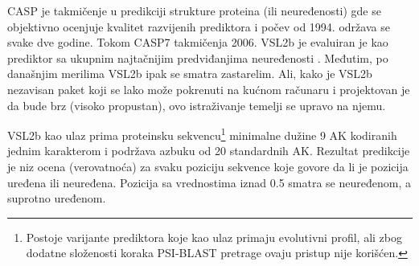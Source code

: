 CASP  je takmičenje u
predikciji strukture proteina (ili neuređenosti) gde se objektivno ocenjuje
kvalitet razvijenih prediktora i počev od 1994. održava se svake dve godine.
Tokom CASP7 takmičenja 2006. VSL2b je evaluiran je kao prediktor sa ukupnim
najtačnijim predviđanjima neuređenosti \parencite{He2009}. Međutim, po
današnjim merilima \parencite{Meng2017} VSL2b ipak se smatra zastarelim.  Ali,
kako je VSL2b nezavisan paket koji se lako može pokrenuti na kućnom računaru i
projektovan je da bude brz (visoko propustan), ovo istraživanje temelji se
upravo na njemu.

VSL2b kao ulaz prima proteinsku sekvencu\footnote{
  Postoje varijante prediktora koje kao ulaz primaju evolutivni profil, ali zbog
  dodatne složenosti koraka PSI-BLAST pretrage ovaju pristup nije korišćen.
}
minimalne dužine 9 AK kodiranih jednim
karakterom i podržava azbuku od 20 standardnih AK. Rezultat predikcije je niz
ocena (verovatnoća) za svaku poziciju sekvence
koje govore da li je pozicija uređena ili neuređena. Pozicija sa vrednostima iznad
0.5 smatra se neuređenom, a suprotno uređenom.





